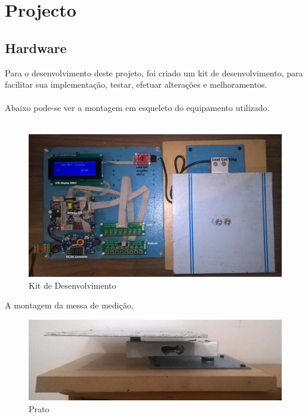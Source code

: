 \chapter{Projecto}
\section{Hardware}
Para o desenvolvimento deste projeto, foi criado um kit de desenvolvimento, para facilitar sua implementação, testar, efetuar alterações e melhoramentos.\\
\\
Abaixo pode-se ver a montagem em esqueleto do equipamento utilizado.
\newline
\\
\\
\begin{figure}[H]
	\centering
	\includegraphics[scale=0.15]{./image/PESTA/kit/Kit_Desenvolvimento_2.jpg}
	\caption{Kit de Desenvolvimento}
	\label{Kit_Desenvolvimento_2}
\end{figure}
\newpage
A montagem da messa de medição,
\begin{figure}[H]
	\centering
	\includegraphics[scale=0.15]{./image/PESTA/material/Prato.jpg}
	\caption{Prato}
	\label{Prato}
\end{figure}
